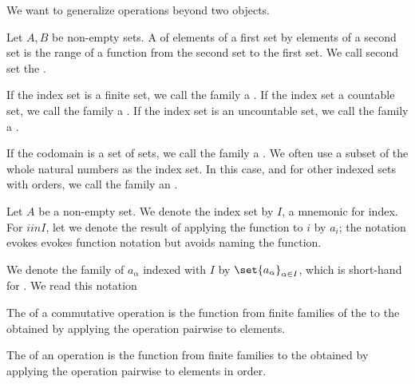 
\sbasic





\sstart



We want to generalize operations beyond
two objects.


Let $A,B$ be non-empty sets.
A  of elements of a first
set  by elements
of a second set is the range of a function
from the second set to the first set.
We call second set the .

If the index set is a finite set,
we call the family a
.
If the index set a countable set,
we call the family a
.
If the index set is an uncountable set,
we call the family a
.

If the codomain is a set of sets, we
call the family a .
We often use a subset of the whole natural numbers
as the index set.
In this case, and for other indexed sets with
orders, we call the family an .


Let $A$ be a non-empty set.
We denote the index set by $I$, a mnemonic
for index.
For $i in I$, let we denote the result of applying
the function to $i$ by $a_{i}$; the notation evokes
evokes function notation but avoids naming the
function.

We denote the family of $a_{\alpha}$ indexed with $I$
by $\set{a_{\alpha}}_{\alpha \in I}$, which is short-hand
for .
We read this notation 


The 
of a commutative operation is the function from
finite families of the 
to the  obtained by
applying the operation pairwise to elements.

The 
of an operation is the function from finite families
 to the
 obtained by
applying the operation pairwise to elements in order.

